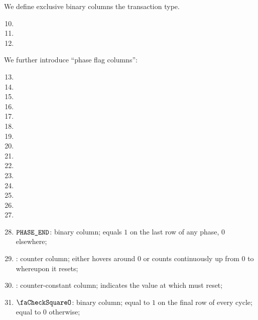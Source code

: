We define exclusive binary columns the transaction type.
\begin{multicols}{3}
    \begin{enumerate}
	    \setcounter{enumi}{9}
	\item \typeZeroTx{}
	\item \typeOneTx{}
	\item \typeTwoTx{}
    \end{enumerate}
\end{multicols}
We further introduce ``phase flag columns'':
\begin{multicols}{3}
    \begin{enumerate}[resume]
	    \setcounter{enumi}{12}
	\item \phaseRlpPrefix{}
	\item \phaseChainId{}
	\item \phaseNonce{}
	\item \phaseGasPrice{}
	\item \phaseGasLimit{}
	\item \phaseTo{}
	\item \phaseValue{}
	\item \phaseData{}
	\item \phaseAccessList{}
	\item \phaseBeta{}
	\item \phaseMaxPriorityFeePerGas{}
	\item \phaseMaxFeePerGas{}
	\item \phaseY{}
	\item \phaseR{}
	\item \phaseS{}
    \end{enumerate}
\end{multicols}
\begin{enumerate}
	\setcounter{enumi}{27}
    \item $\texttt{PHASE\_END}$:
	binary column; equals $1$ on the last row of any phase, $0$ elsewhere;
    \item \ct{}:
	counter column; 
	either hovers around $0$ or counts continuously up from $0$ to \maxCt{} whereupon it resets;
    \item \maxCt:
	counter-constant column;
	indicates the value at which \ct{} must reset;
    \item $\done$:
	binary column; equal to $1$ on the final row of every \ct{} cycle; equal to $0$ otherwise;
\end{enumerate}
